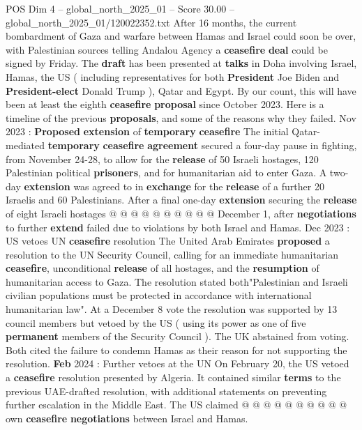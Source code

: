 \begin{textsample}{POS Dim 4 – global\_north\_2025\_01 – Score 30.00 – global\_north\_2025\_01/120022352.txt}  \label{ex:f4_pos_048}
After 16 months, the current bombardment of Gaza and warfare between Hamas and Israel could soon be over, with Palestinian sources telling Andalou Agency a \textbf{ceasefire} \textbf{deal} could be signed by Friday.
The \textbf{draft} has been presented at \textbf{talks} in Doha involving Israel, Hamas, the US ( including representatives for both \textbf{President} Joe Biden and \textbf{President-elect} Donald Trump ), Qatar and Egypt.
By our count, this will have been at least the eighth \textbf{ceasefire} \textbf{proposal} since October 2023.
Here is a timeline of the previous \textbf{proposals}, and some of the reasons why they failed.
Nov 2023 : \textbf{Proposed} \textbf{extension} of \textbf{temporary} \textbf{ceasefire} The initial Qatar-mediated \textbf{temporary} \textbf{ceasefire} \textbf{agreement} secured a four-day pause in fighting, from November 24-28, to allow for the \textbf{release} of 50 Israeli hostages, 120 Palestinian political \textbf{prisoners}, and for humanitarian aid to enter Gaza.
A two-day \textbf{extension} was agreed to in \textbf{exchange} for the \textbf{release} of a further 20 Israelis and 60 Palestinians.
After a final one-day \textbf{extension} securing the \textbf{release} of eight Israeli hostages @ @ @ @ @ @ @ @ @ @ December 1, after \textbf{negotiations} to further \textbf{extend} failed due to violations by both Israel and Hamas.
Dec 2023 : US vetoes UN \textbf{ceasefire} resolution The United Arab Emirates \textbf{proposed} a resolution to the UN Security Council, calling for an immediate humanitarian \textbf{ceasefire}, unconditional \textbf{release} of all hostages, and the \textbf{resumption} of humanitarian access to Gaza.
The resolution stated both"Palestinian and Israeli civilian populations must be protected in accordance with international humanitarian law".
At a December 8 vote the resolution was supported by 13 council members but vetoed by the US ( using its power as one of five \textbf{permanent} members of the Security Council ).
The UK abstained from voting.
Both cited the failure to condemn Hamas as their reason for not supporting the resolution. \textbf{Feb} 2024 : Further vetoes at the UN On February 20, the US vetoed a \textbf{ceasefire} resolution presented by Algeria.
It contained similar \textbf{terms} to the previous UAE-drafted resolution, with additional statements on preventing further escalation in the Middle East.
The US claimed @ @ @ @ @ @ @ @ @ @ own \textbf{ceasefire} \textbf{negotiations} between Israel and Hamas.

\end{textsample}
